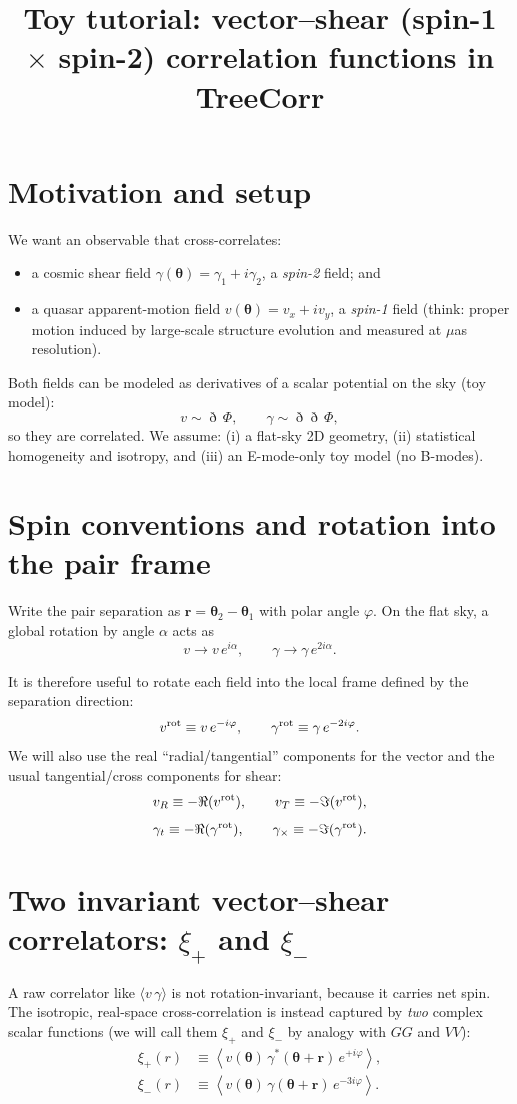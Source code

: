 \documentclass[11pt]{article}
\title{Toy tutorial: vector--shear (spin-1 $\times$ spin-2) correlation functions in TreeCorr}
\author{}
\date{}
\begin{document}
\maketitle

\section{Motivation and setup}
We want an observable that cross-correlates:
\begin{itemize}
  \item a cosmic shear field $\gamma(\boldsymbol\theta)=\gamma_1+i\gamma_2$, a \emph{spin-2} field; and
  \item a quasar apparent-motion field $v(\boldsymbol\theta)=v_x+i v_y$, a \emph{spin-1} field (think: proper motion induced by large-scale structure evolution and measured at $\mu$as resolution).
\end{itemize}

Both fields can be modeled as derivatives of a scalar potential on the sky (toy model):
\[
  v \sim \eth\,\Phi,\qquad \gamma \sim \eth\eth\,\Phi,
\]
so they are correlated.
We assume:
(i) a flat-sky 2D geometry, (ii) statistical homogeneity and isotropy, and (iii) an E-mode-only toy model (no B-modes).

\section{Spin conventions and rotation into the pair frame}
Write the pair separation as $\boldsymbol r = \boldsymbol\theta_2-\boldsymbol\theta_1$ with polar angle $\varphi$.
On the flat sky, a global rotation by angle $\alpha$ acts as
\[
  v \to v\,e^{i\alpha},\qquad \gamma \to \gamma\,e^{2i\alpha}.
\]

It is therefore useful to rotate each field into the local frame defined by the separation direction:
\[
  v^{\rm rot} \equiv v\,e^{-i\varphi},\qquad
  \gamma^{\rm rot} \equiv \gamma\,e^{-2i\varphi}.
\]
We will also use the real ``radial/tangential'' components for the vector and the usual tangential/cross components for shear:
\[
  v_R \equiv -\Re(v^{\rm rot}),\qquad v_T \equiv -\Im(v^{\rm rot}),
\]
\[
  \gamma_t \equiv -\Re(\gamma^{\rm rot}),\qquad \gamma_\times \equiv -\Im(\gamma^{\rm rot}).
\]

\section{Two invariant vector--shear correlators: $\xi_+$ and $\xi_-$}
A raw correlator like $\langle v\,\gamma\rangle$ is not rotation-invariant, because it carries net spin.
The isotropic, real-space cross-correlation is instead captured by \emph{two} complex scalar functions (we will call them $\xi_+$ and $\xi_-$ by analogy with $GG$ and $VV$):
\begin{align}
  \xi_+(r)
  &\equiv \left\langle v(\boldsymbol\theta)\,\gamma^*(\boldsymbol\theta+\boldsymbol r)\,e^{+i\varphi}\right\rangle,\\
  \xi_-(r)
  &\equiv \left\langle v(\boldsymbol\theta)\,\gamma(\boldsymbol\theta+\boldsymbol r)\,e^{-3i\varphi}\right\rangle.
\end{align}
\end{document}
